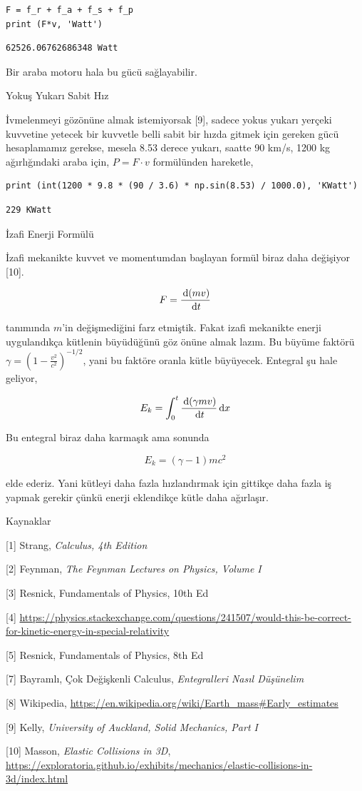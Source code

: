 \documentclass[12pt,fleqn]{article}\usepackage{../../common}
\begin{document}
\begin{verbatim}  
F = f_r + f_a + f_s + f_p
print (F*v, 'Watt')
\end{verbatim}

\begin{verbatim}
62526.06762686348 Watt
\end{verbatim}

Bir araba motoru hala bu gücü sağlayabilir.

Yokuş Yukarı Sabit Hız

İvmelenmeyi gözönüne almak istemiyorsak [9], sadece yokus yukarı yerçeki
kuvvetine yetecek bir kuvvetle belli sabit bir hızda gitmek için gereken gücü
hesaplamamız gerekse, mesela 8.53 derece yukarı, saatte 90 km/s, 1200 kg
ağırlığındaki araba için, $P = F \cdot v$ formülünden hareketle,

\begin{verbatim}
print (int(1200 * 9.8 * (90 / 3.6) * np.sin(8.53) / 1000.0), 'KWatt')
\end{verbatim}

\begin{verbatim}
229 KWatt
\end{verbatim}

İzafi Enerji Formülü

İzafi mekanikte kuvvet ve momentumdan başlayan formül biraz daha değişiyor [10].

$$
F = \frac{\,\mathrm{d} (mv)}{\,\mathrm{d} t}
$$

tanımında $m$'in değişmediğini farz etmiştik. Fakat izafi mekanikte enerji
uygulandıkça kütlenin büyüdüğünü göz önüne almak lazım. Bu büyüme faktörü
$\gamma = \left(1 - \frac{v^2}{c^2} \right)^{-1/2}$, yani bu faktöre oranla
kütle büyüyecek. Entegral şu hale geliyor,

$$
E_k = \int_{0}^{t} \frac{\,\mathrm{d} (\gamma mv)}{\,\mathrm{d} t} \,\mathrm{d} x
$$

Bu entegral biraz daha karmaşık ama sonunda

$$
E_k = (\gamma - 1)mc^2
$$

elde ederiz. Yani kütleyi daha fazla hızlandırmak için gittikçe daha fazla iş
yapmak gerekir çünkü enerji eklendikçe kütle daha ağırlaşır. 

Kaynaklar 

[1] Strang, {\em Calculus, 4th Edition}

[2] Feynman, {\em The Feynman Lectures on Physics, Volume I}

[3] Resnick, Fundamentals of Physics, 10th Ed

[4] \url{https://physics.stackexchange.com/questions/241507/would-this-be-correct-for-kinetic-energy-in-special-relativity}

[5] Resnick, Fundamentals of Physics, 8th Ed

[7] Bayramlı, Çok Değişkenli Calculus, {\em Entegralleri Nasıl Düşünelim}

[8] Wikipedia, \url{https://en.wikipedia.org/wiki/Earth_mass#Early_estimates}

[9] Kelly, {\em University of Auckland, Solid Mechanics, Part I}

[10] Masson, {\em Elastic Collisions in 3D}, \url{https://exploratoria.github.io/exhibits/mechanics/elastic-collisions-in-3d/index.html}
\end{document}
